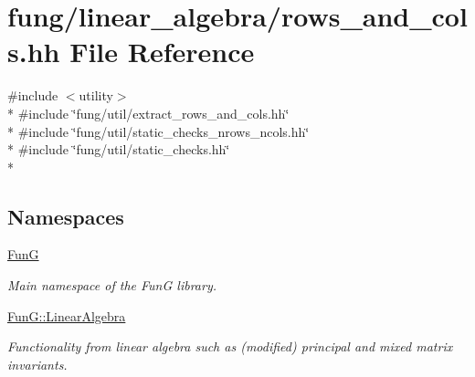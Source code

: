 \hypertarget{rows__and__cols_8hh}{}\section{fung/linear\+\_\+algebra/rows\+\_\+and\+\_\+cols.hh File Reference}
\label{rows__and__cols_8hh}
{\ttfamily \#include $<$utility$>$}\\*
{\ttfamily \#include \char`\"{}fung/util/extract\+\_\+rows\+\_\+and\+\_\+cols.\+hh\char`\"{}}\\*
{\ttfamily \#include \char`\"{}fung/util/static\+\_\+checks\+\_\+nrows\+\_\+ncols.\+hh\char`\"{}}\\*
{\ttfamily \#include \char`\"{}fung/util/static\+\_\+checks.\+hh\char`\"{}}\\*
\subsection*{Namespaces}
\begin{DoxyCompactItemize}
\item 
 \hyperlink{namespaceFunG}{Fun\+G}
\begin{DoxyCompactList}\small\item\em Main namespace of the Fun\+G library. \end{DoxyCompactList}\item 
 \hyperlink{namespaceFunG_1_1LinearAlgebra}{Fun\+G\+::\+Linear\+Algebra}
\begin{DoxyCompactList}\small\item\em Functionality from linear algebra such as (modified) principal and mixed matrix invariants. \end{DoxyCompactList}\end{DoxyCompactItemize}
